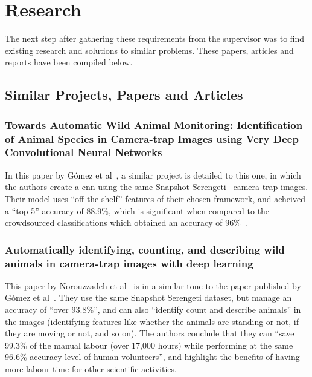 \section{Research}

The next step after gathering these requirements from the supervisor was to
find existing research and solutions to similar problems. These papers,
articles and reports have been compiled below.

\subsection{Similar Projects, Papers and Articles}

\subsubsection{Towards Automatic Wild Animal Monitoring: Identification of
Animal Species in Camera-trap Images using Very Deep Convolutional Neural
Networks}
In this paper by Gómez et al~\cite{gomez2016towards}, a similar project is
detailed to this one, in which the authors create a \acrlong{cnn} using the
same Snapshot Serengeti~\cite{swanson2015snapshot} camera trap images. Their
model uses ``off-the-shelf'' features of their chosen framework, and acheived
a ``top-5'' accuracy of 88.9\%, which is significant when compared to the
crowdsourced classifications which obtained an accuracy of
96\%~\cite{swanson2015snapshot}.

\subsubsection{Automatically identifying, counting, and describing wild
animals in camera-trap images with deep learning}
This paper by Norouzzadeh et al~\cite{norouzzadehautomatically} is in a
similar tone to the paper published by Gómez et al~\cite{gomez2016towards}.
They use the same Snapshot Serengeti dataset, but manage an accuracy of
``over 93.8\%'', and can also ``ìdentify count and describe animals'' in the
images (identifying features like whether the animals are standing or not, if
they are moving or not, and so on). The authors conclude that they can ``save
99.3\% of the manual labour (over 17,000 hours) while performing at the same
96.6\% accuracy level of human volunteers'', and highlight the benefits of
having more labour time for other scientific activities.

